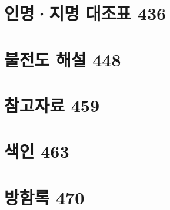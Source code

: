 \documentclass[12pt, a4paper, oneside]{book}
\let\stdsection\section
\renewcommand\section{\newpage\stdsection}
\begin{document}
	\section{인명·지명 대조표 436 }

	\section{불전도 해설 448 }

	\section{참고자료 459}

	\section{색인 463 }

	\section{방함록 470}


\end{document}
